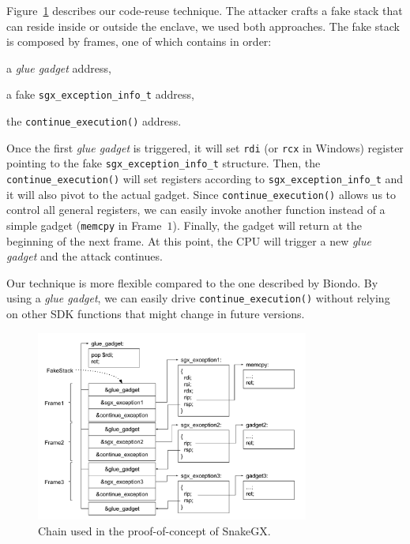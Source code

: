 Figure~\ref{fig:flavio-enclave-chain} describes our code-reuse technique.
The attacker crafts a fake stack that can reside inside or outside the enclave,
we used both approaches. The fake stack is composed by frames, one of which contains in order:
\begin{enumerate*}[label=(\roman*)]
	\item a \emph{glue gadget} address,
	\item a fake \texttt{sgx\_exception\_info\_t} address,
	\item the \texttt{continue\_execution()} address.
\end{enumerate*}
Once the first \emph{glue gadget} is triggered, it will set \texttt{rdi} (or \texttt{rcx} in Windows) register pointing to the fake \texttt{sgx\_exception\_info\_t} structure.
Then, the \texttt{continue\_execution()} will set registers according to \texttt{sgx\_exception\_info\_t} 
and it will also pivot to the actual gadget.
Since \texttt{continue\_execution()} allows us to control all general registers,
we can easily invoke another function instead of a simple gadget (\eg \texttt{memcpy} in Frame~$1$).
Finally, the gadget will return at the beginning of the next frame.
At this point, the CPU will trigger a new \emph{glue gadget} and the attack continues.

Our technique is more flexible compared to the one described by Biondo.
By using a \emph{glue gadget}, we can easily drive \texttt{continue\_execution()} without
relying on other SDK functions that might change in future versions.

\begin{figure}[t]
	\centering
	\includegraphics[width=0.8\textwidth]{fig_c5/flavio-enclave-chain.pdf}
	\caption{Chain used in the proof-of-concept of SnakeGX.}
	\label{fig:flavio-enclave-chain}
\end{figure}